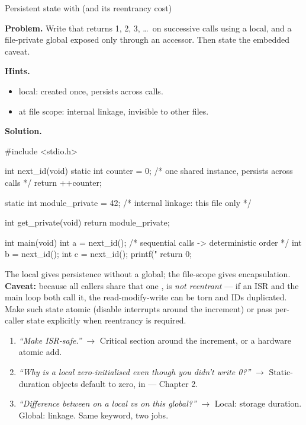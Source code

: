 \begin{gymproblem}{Persistent state with  (and its reentrancy
cost)}

\textbf{Problem.} Write  that returns 1, 2, 3, \dots\ on
successive calls using a  local, and a file-private global
exposed only through an accessor. Then state the embedded caveat.

\textbf{Hints.}
\begin{itemize}
\item {} local: created once, persists across calls.
\item {} at file scope: internal linkage, invisible to other
   files.
\end{itemize}

\attempt

\textbf{Solution.}
\begin{cgym}
#include <stdio.h>

int next_id(void) {
    static int counter = 0;   /* one shared instance, persists across calls */
    return ++counter;
}

static int module_private = 42;   /* internal linkage: this file only */

int get_private(void) {
    return module_private;
}

int main(void) {
    int a = next_id();        /* sequential calls -> deterministic order */
    int b = next_id();
    int c = next_id();
    printf("%
    return 0;
}
\end{cgym}

The  local gives persistence without a global; the file-scope
 gives encapsulation. \textbf{Caveat:} because all callers share
that one ,  is \emph{not reentrant} --- if an ISR
and the main loop both call it, the  read-modify-write can be
torn and IDs duplicated. Make such state atomic (disable interrupts around the
increment) or pass per-caller state explicitly when reentrancy is required.

\followups
\begin{enumerate}
\item \emph{``Make  ISR-safe.''} $\rightarrow$ Critical section
  around the increment, or a hardware atomic add.
\item \emph{``Why is a  local zero-initialised even though you
  didn't write 0?''} $\rightarrow$ Static-duration objects default to zero,
  in  --- Chapter 2.
\item \emph{``Difference between  on a local vs on this global?''}
  $\rightarrow$ Local: storage duration. Global: linkage. Same keyword, two
  jobs.
\end{enumerate}
\end{gymproblem}

